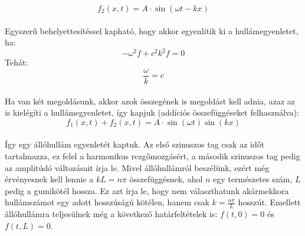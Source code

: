 \documentclass[a4paper]{article}
\begin{document}
\begin{equation}
f_2(x,t)=A \cdot \sin(\omega t-kx)
\end{equation}
\\
Egyszerű behelyettesítéssel kapható, hogy akkor egyenlítik ki a hullámegyenletet, ha:
\\
\begin{equation}
-\omega ^{2} f+ c^{2}k^{2}f=0
\end{equation}
Tehát:
\begin{equation}
\frac{\omega}{k}=c
\end{equation}
\\
Ha van két megoldásunk, akkor azok összegének is megoldást kell adnia, azaz az is kielégíti a hullámegyenletet, így kapjuk (addíciós összefüggéseket felhasználva):
\begin{equation}
f_1(x,t)+ f_2(x,t)=A \cdot \sin(\omega t) \sin(kx)
\end{equation}
\\
Így egy állóhullám egyenletét kaptuk. Az első szinuszos tag csak az időt tartalmazza, ez felel a harmonikus rezgőmozgásért, a második szinuszos tag pedig az amplitúdó változásait írja le. Mivel állóhullámról beszélünk, ezért még érvényesnek kell lennie a $kL= n \pi$ összefüggésnek, ahol $n$ egy természetes szám, $L$ pedig a gumikötél hossza. Ez azt írja le, hogy nem választhatunk akármekkora hullámszámot egy adott hosszúságú kötélen, hanem csak $k=\frac{n \pi}{L}$ hosszút. Emellett állóhullámra teljesülnek még a következő határfeltételek is: $f(t,0)=0$ és $f(t,L)=0$.
\\
\end{document}
